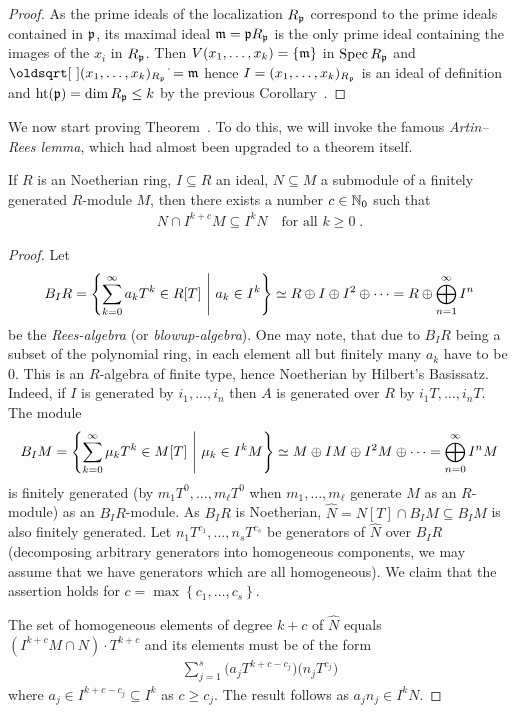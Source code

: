 \documentclass[a4paper,parskip=half,numbers=enddot, DIV=12, headheight=30pt]{scrreprt}
\begin{document}
\begin{proof}
    As the prime ideals of the localization $R_{\mathfrak{p}}$ correspond to the prime ideals contained in $\mathfrak{p}$, its maximal ideal $\mathfrak{m}=\mathfrak{p} R_{\mathfrak{p}}$ is the only prime ideal containing the images of the $x_i$ in $R_{\mathfrak{p}}$. Then $V(x_1,\ldots, x_k) =\{\mathfrak{m}\}$ in $\operatorname{Spec} R_{\mathfrak{p}}$ and $\sqrt{(x_1,\ldots,x_k)_{R_\pp}}=\mm$ hence $I=(x_1,\ldots, x_k)_{R_{\mathfrak{p}}}$ is an ideal of definition and $\operatorname{ht}(\mathfrak{p})=\dim R_{\mathfrak{p}} \leq k$ by the previous Corollary~.
\end{proof}
We now start proving Theorem~. To do this, we will invoke the famous \emph{Artin--Rees lemma}, which had almost been upgraded to a theorem itself.
\begin{prop} 
    If $R$ is an Noetherian ring, $I\subseteq R$ an ideal, $N\subseteq M$ a submodule of a finitely generated $R$-module $M$, then there exists a number $c\in\mathbb{N}_0$ such that 
    \begin{align*}
    	N\cap I^{k+c}M \subseteq I^kN\quad\text{for all }k\geq 0\;. 
    \end{align*}
\end{prop}
\begin{proof}
    Let 
    \begin{align*}
        B_IR = \left\{\sum_{k=0}^\infty a_kT^k\in R[T] \ \middle|\  a_k\in I^k\right\}\simeq R\oplus I\oplus I^2\oplus\cdots= R\oplus\bigoplus_{n=1}^\infty I^n
    \end{align*}
    be the \emph{Rees-algebra} (or \emph{blowup-algebra}). One may note, that due to $B_IR$ being a subset of the polynomial ring, in each element all but finitely many $a_k$ have to be $0$. This is an $R$-algebra of finite type, hence Noetherian by Hilbert's Basissatz. Indeed, if $I$ is generated by $i_1,\ldots,i_n$ then $A$ is generated over $R$ by $i_1T,\ldots,i_nT$. The module 
    \begin{align*}
        B_IM = \left\{\sum_{k=0}^\infty \mu_kT^k\in M[T] \ \middle|\  \mu_k \in I^kM\right\}\simeq M\oplus IM\oplus I^2M\oplus\cdots=\bigoplus_{n=0}^\infty I^nM
    \end{align*}
    is finitely generated (by $m_1T^0,\ldots,m_\ell T^0$ when $m_1,\ldots,m_\ell$ generate $M$ as an $R$-module) as an $B_IR$-module. As $B_IR$ is Noetherian, $\widehat N = N[T]\cap B_IM \subseteq B_IM$ is also finitely generated. Let $n_1T^{c_1},\ldots,n_sT^{c_s}$ be generators of $\widehat N$ over $B_IR$ (decomposing arbitrary generators into homogeneous components, we may assume that we have generators which are all homogeneous). We claim that the assertion holds for $c = \max\left\{c_1,\ldots,c_s\right\}$. 
    
    The set of homogeneous elements of degree $k+c$ of $\widehat N$ equals $(I^{k+c}M\cap N)\cdot T^{k+c}$ and its elements must be of the form
    \begin{align*}
        \sum_{j = 1}^s \big(a_j T^{k+c-c_j}\big)\big(n_j T^{c_j}\big)
    \end{align*}
    where $a_j \in I^{k+c-c_j} \subseteq I^k$ as $c\geq c_j$. The result follows as $a_j n_j \in I^k N$.
\end{proof}
\end{document}
